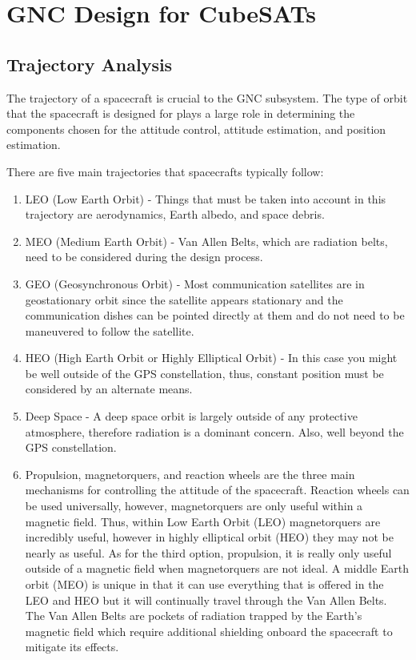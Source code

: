 \documentclass{article}
\begin{document}
\section{GNC Design for CubeSATs}

\subsection{Trajectory Analysis}

The trajectory of a spacecraft is crucial to the GNC subsystem. The
type of orbit that the spacecraft is designed for plays a large role
in determining the components chosen for the attitude control,
attitude estimation, and position estimation.  

There are five main trajectories that spacecrafts typically follow:
\begin{enumerate}[itemsep=-5pt]
\item LEO  (Low Earth Orbit) - Things that must be taken into account
  in this trajectory are aerodynamics, Earth albedo, and space
  debris. 
\item MEO (Medium Earth Orbit) - Van Allen Belts, which are radiation
  belts, need to be considered during the design process. 
\item GEO (Geosynchronous Orbit) - Most communication satellites are
  in geostationary orbit since the satellite appears stationary and
  the communication dishes can be pointed directly at them and do not
  need to be maneuvered to follow the satellite. 
\item HEO (High Earth Orbit or Highly Elliptical Orbit) - In this case
  you might be well outside of the GPS constellation, thus, constant
  position must be considered by an alternate means. 
\item Deep Space - A deep space orbit is largely outside of any
  protective atmosphere, therefore radiation is a dominant
  concern. Also, well beyond the GPS constellation. 
\item Propulsion, magnetorquers, and reaction wheels are the three
  main mechanisms for controlling the attitude of the
  spacecraft. Reaction wheels can be used universally, however,
  magnetorquers are only useful within a magnetic field. Thus, within
  Low Earth Orbit (LEO) magnetorquers are incredibly useful, however
  in highly elliptical orbit (HEO) they may not be nearly as
  useful. As for the third option, propulsion, it is really only
  useful outside of a magnetic field when magnetorquers are not
  ideal. A middle Earth orbit (MEO) is unique in that it can use
  everything that is offered in the LEO and HEO but it will
  continually travel through the Van Allen Belts. The Van Allen Belts
  are pockets of radiation trapped by the Earth’s magnetic field which
  require additional shielding onboard the spacecraft to mitigate its
  effects.
\end{enumerate}
\end{document}
